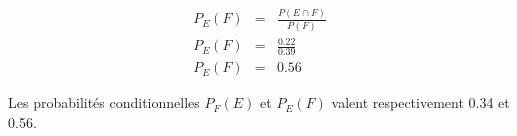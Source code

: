 \documentclass[a4paper,11pt]{exam}
\begin{document}
\begin{questions}
\begin{parts}
				\begin{eqnarray*}
					P_E(F) &=& \frac{P(E \cap F)}{P(F)} \\
					P_E(F) &=& \frac{\num{0.22}}{\num{0.39}} \\
					P_E(F) &=& \num{0.56}
				\end{eqnarray*}

			
		Les probabilités conditionnelles $P_F(E)$ et $P_E(F)$ valent respectivement \num{0.34} et \num{0.56}.		
	\end{parts}
\end{questions}

\label{LastPage}
\end{document}
